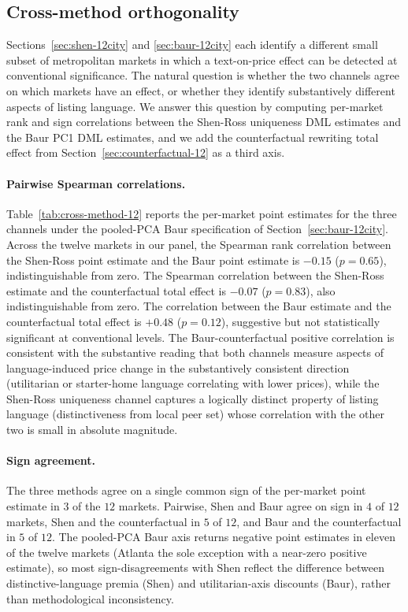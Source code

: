 
\subsection{Cross-method orthogonality}
\label{sec:cross-method-12}

Sections~\ref{sec:shen-12city} and \ref{sec:baur-12city} each identify
a different small subset of metropolitan markets in which a
text-on-price effect can be detected at conventional significance.
The natural question is whether the two channels agree on which
markets have an effect, or whether they identify substantively
different aspects of listing language. We answer this question by
computing per-market rank and sign correlations between the
Shen-Ross uniqueness DML estimates and the Baur PC1 DML estimates,
and we add the counterfactual rewriting total effect from
Section~\ref{sec:counterfactual-12} as a third axis.

\paragraph{Pairwise Spearman correlations.}
Table~\ref{tab:cross-method-12} reports the per-market point
estimates for the three channels under the pooled-PCA Baur
specification of Section~\ref{sec:baur-12city}. Across the twelve
markets in our panel, the Spearman rank correlation between the
Shen-Ross point estimate and the Baur point estimate is $-0.15$
($p = 0.65$), indistinguishable from zero. The Spearman correlation
between the Shen-Ross estimate and the counterfactual total effect
is $-0.07$ ($p = 0.83$), also indistinguishable from zero. The
correlation between the Baur estimate and the counterfactual total
effect is $+0.48$ ($p = 0.12$), suggestive but not statistically
significant at conventional levels.  The Baur-counterfactual
positive correlation is consistent with the substantive reading that
both channels measure aspects of language-induced price change in
the substantively consistent direction (utilitarian or starter-home
language correlating with lower prices), while the Shen-Ross
uniqueness channel captures a logically distinct property of
listing language (distinctiveness from local peer set) whose
correlation with the other two is small in absolute magnitude.

\paragraph{Sign agreement.} The three methods agree on a single
common sign of the per-market point estimate in $3$ of the $12$
markets. Pairwise, Shen and Baur agree on sign in $4$ of $12$
markets, Shen and the counterfactual in $5$ of $12$, and Baur and
the counterfactual in $5$ of $12$.  The pooled-PCA Baur axis returns
negative point estimates in eleven of the twelve markets (Atlanta
the sole exception with a near-zero positive estimate), so most
sign-disagreements with Shen reflect the difference between
distinctive-language premia (Shen) and utilitarian-axis discounts
(Baur), rather than methodological inconsistency.

